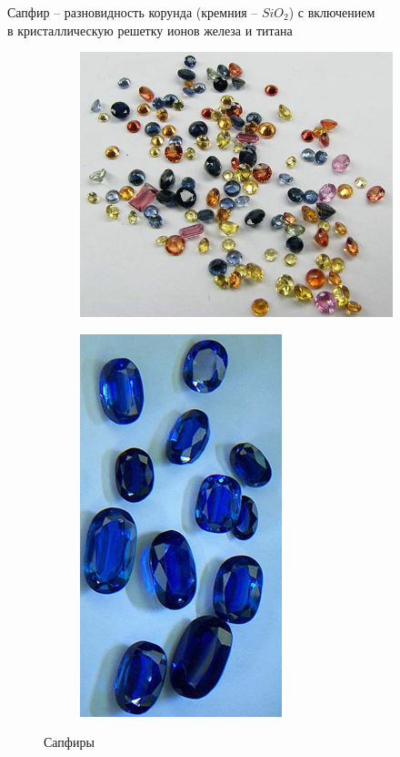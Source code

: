 \documentclass[_Banking_p3.tex]{subfiles}
\begin{document}
\begin{frame}{Сапфир }{– разновидность корунда (кремния – $SiO_2$) с включением\\ в кристаллическую решетку ионов железа и титана}
\begin{figure}	
	\centering
	\begin{subfigure}[t]{4.3cm}
		\centering
		\includegraphics[scale=0.45]{img/sapphire1.png}
	\caption{}\label{fig:sapphire1}	
	\end{subfigure}
	\quad
	\begin{subfigure}[t]{4.3cm}
		\centering
		\includegraphics[scale=0.5]{img/sapphire2.png}
		\caption{}\label{fig:sapphire2}
	\end{subfigure}
	\caption{Сапфиры}\label{fig:sapphires}
\end{figure}
\end{frame}
\end{document}
